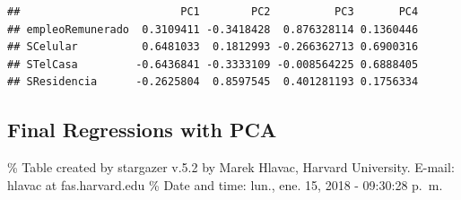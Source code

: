 \documentclass[]{article}
\newenvironment{Shaded}{\begin{snugshade}}{\end{snugshade}}
\newcommand{\KeywordTok}[1]{\textcolor[rgb]{0.13,0.29,0.53}{\textbf{#1}}}
\newcommand{\DataTypeTok}[1]{\textcolor[rgb]{0.13,0.29,0.53}{#1}}
\newcommand{\DecValTok}[1]{\textcolor[rgb]{0.00,0.00,0.81}{#1}}
\newcommand{\StringTok}[1]{\textcolor[rgb]{0.31,0.60,0.02}{#1}}
\newcommand{\CommentTok}[1]{\textcolor[rgb]{0.56,0.35,0.01}{\textit{#1}}}
\newcommand{\OtherTok}[1]{\textcolor[rgb]{0.56,0.35,0.01}{#1}}
\newcommand{\OperatorTok}[1]{\textcolor[rgb]{0.81,0.36,0.00}{\textbf{#1}}}
\newcommand{\NormalTok}[1]{#1}
\begin{document}
\begin{verbatim}
##                         PC1        PC2          PC3       PC4
## empleoRemunerado  0.3109411 -0.3418428  0.876328114 0.1360446
## SCelular          0.6481033  0.1812993 -0.266362713 0.6900316
## STelCasa         -0.6436841 -0.3333109 -0.008564225 0.6888405
## SResidencia      -0.2625804  0.8597545  0.401281193 0.1756334
\end{verbatim}

\subsection{Final Regressions with
PCA}\label{final-regressions-with-pca}

\begin{Shaded}
\end{Shaded}

\% Table created by stargazer v.5.2 by Marek Hlavac, Harvard University.
E-mail: hlavac at fas.harvard.edu \% Date and time: lun., ene. 15, 2018
- 09:30:28 p.~m.
\end{document}
